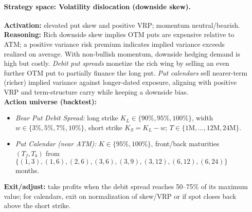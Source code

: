 \documentclass[12pt,a4paper]{report}
\begin{document}
\paragraph{Strategy space: Volatility dislocation (downside skew).}
\textbf{Activation:} elevated put skew and positive VRP; momentum neutral/bearish. \\[2pt]
\textbf{Reasoning:} Rich downside skew implies OTM puts are expensive relative to ATM; a positive variance risk premium indicates implied variance exceeds realized on average. With non-bullish momentum, downside hedging demand is high but costly. \emph{Debit put spreads} monetize the rich wing by selling an even further OTM put to partially finance the long put. \emph{Put calendars} sell nearer-term (richer) implied variance against longer-dated exposure, aligning with positive VRP and term-structure carry while keeping a downside bias. \\[2pt]
\textbf{Action universe (backtest):}
\begin{itemize}
    \item \emph{Bear Put Debit Spread:} long strike $K_L \in \{90\%,95\%,100\%\}$,\; width $w \in \{3\%,5\%,7\%,10\%\}$,\; short strike $K_S=K_L-w$;\;
    $T \in \{1\text{M},\dots,12\text{M},24\text{M}\}$.
    \item \emph{Put Calendar (near ATM):} $K \in \{95\%,100\%\}$,\; front/back maturities $(T_f, T_b)$ from
    $\{(1,3),(1,6),(2,6),(3,6),(3,9),(3,12),(6,12),(6,24)\}$ months.
\end{itemize}
\textbf{Exit/adjust:} take profits when the debit spread reaches 50--75\% of its maximum value; for calendars, exit on normalization of skew/VRP or if spot closes back above the short strike.
\end{document}
